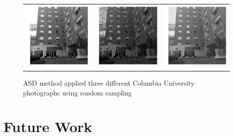 \documentclass[12pt]{article}
\begin{document}
\begin{figure}[H]
{{\begin{tabular}{ccc}
\includegraphics[width=65mm]{figures/columbia7.png}
&
\includegraphics[width=65mm]{figures/columbia8.png}
&
\includegraphics[width=65mm]{figures/columbia9.png}
\\
\end{tabular}
}
}

\caption{ASD method applied three different Columbia University photographs using random sampling}
\label{fig:columbia_pics}
\end{figure}

\section{Future Work}
\end{document}
